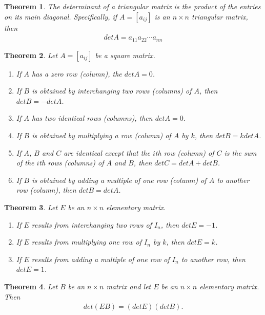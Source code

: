 \documentclass{article}
\theoremstyle{sltheorem}
\newtheorem{theorem}{Theorem}[section]
\begin{document}
\begin{theorem}
    The determinant of a triangular matrix is the product of the entries on its main diagonal.
    Specifically, if $A=[a_{ij}]$ is an $n\times n$ triangular matrix, then
    \begin{align*}
        det A = a_{11}a_{22}\cdots a_{nn}
    \end{align*}
\end{theorem}
\begin{theorem}
    Let $A=[a_{ij}]$ be a square matrix.
    \begin{enumerate}
        \item If $A$ has a zero row (column), the $det A = 0$.
        \item If $B$ is obtained by interchanging two rows (columns) of $A$, then $det B = -det A$.
        \item If $A$ has two identical rows (columns), then $det A = 0$.
        \item If $B$ is obtained by multiplying a row (column) of $A$ by $k$, then $det B = k det A$.
        \item If $A$, $B$ and $C$ are identical except that the $i$th row (column) of $C$ is the sum of the $i$th rows (columns) of $A$ and $B$, then $det C = det A + det B$.
        \item If $B$ is obtained by adding a multiple of one row (column) of $A$ to another row (column), then $det B = det A$.
    \end{enumerate}
\end{theorem}
\begin{theorem}
    Let $E$ be an $n\times n$ elementary matrix.
    \begin{enumerate}
        \item If $E$ results from interchanging two rows of $I_n$, then $det E = -1$.
        \item If $E$ results from multiplying one row of $I_n$ by $k$, then $det E = k$.
        \item If $E$ results from adding a multiple of one row of $I_n$ to another row, then $det E = 1$.
    \end{enumerate}
\end{theorem}
\begin{theorem}
    Let $B$ be an $n\times n$ matrix and let $E$ be an $n\times n$ elementary matrix. Then
    \begin{align*}
        det(EB) = (det E)(det B).
    \end{align*}
\end{theorem}
\end{document}
